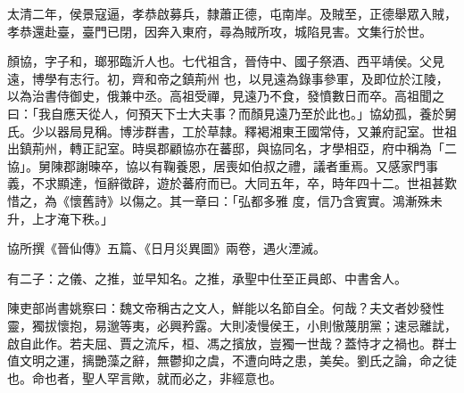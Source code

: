 \begin{pinyinscope}
 太清二年，侯景寇逼，孝恭啟募兵，隸蕭正德，屯南岸。及賊至，正德舉眾入賊，孝恭還赴臺，臺門已閉，因奔入東府，尋為賊所攻，城陷見害。文集行於世。



 顏協，字子和，瑯邪臨沂人也。七代祖含，晉侍中、國子祭酒、西平靖侯。父見遠，博學有志行。初，齊和帝之鎮荊州
 也，以見遠為錄事參軍，及即位於江陵，以為治書侍御史，俄兼中丞。高祖受禪，見遠乃不食，發憤數日而卒。高祖聞之曰：「我自應天從人，何預天下士大夫事？而顏見遠乃至於此也。」協幼孤，養於舅氏。少以器局見稱。博涉群書，工於草隸。釋褐湘東王國常侍，又兼府記室。世祖出鎮荊州，轉正記室。時吳郡顧協亦在蕃邸，與協同名，才學相亞，府中稱為「二協」。舅陳郡謝暕卒，協以有鞠養恩，居喪如伯叔之禮，議者重焉。又感家門事義，不求顯達，恒辭徵辟，遊於蕃府而已。大同五年，卒，時年四十二。世祖甚歎惜之，為《懷舊詩》以傷之。其一章曰：「弘都多雅
 度，信乃含賓實。鴻漸殊未升，上才淹下秩。」



 協所撰《晉仙傳》五篇、《日月災異圖》兩卷，遇火湮滅。



 有二子：之儀、之推，並早知名。之推，承聖中仕至正員郎、中書舍人。



 陳吏部尚書姚察曰：魏文帝稱古之文人，鮮能以名節自全。何哉？夫文者妙發性靈，獨拔懷抱，易邈等夷，必興矜露。大則凌慢侯王，小則慠蔑朋黨；速忌離訧，啟自此作。若夫屈、賈之流斥，桓、馮之擯放，豈獨一世哉？蓋恃才之禍也。群士值文明之運，摛艷藻之辭，無鬱抑之虞，不遭向時之患，美矣。劉氏之論，命之徒也。命也者，聖人罕言歟，就而必之，非經意也。



\end{pinyinscope}